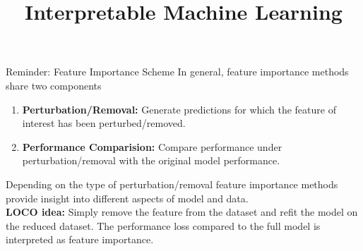 \documentclass[11pt,compress,t,notes=noshow, aspectratio=169, xcolor=table]{beamer}
\title{Interpretable Machine Learning}
\date{}
\begin{document}
	\newcommand{\titlefigure}{figure_man/feature-importance.png}
    \newcommand{\learninggoals}{
    	\item Definition of LOCO
    	\item Interpretation of LOCO}
	
	
	

	


\begin{vbframe}{Reminder: Feature Importance Scheme}
In general, feature importance methods share two components
\lz
\begin{enumerate}
  \item \textbf{Perturbation/Removal:} Generate predictions for which the feature of interest has been perturbed/removed.
  \item \textbf{Performance Comparision:} Compare performance under perturbation/removal with the original model performance.
\end{enumerate}
\lz
Depending on the type of perturbation/removal feature importance methods provide insight into different aspects of model and data.\\
\lz
\textbf{LOCO idea:} Simply remove the feature from the dataset and refit the model on the reduced dataset. The performance loss compared to the full model is interpreted as feature importance.\\

\end{vbframe}
\end{document}
